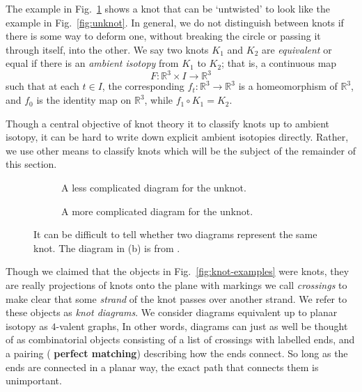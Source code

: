 \documentclass[12pt]{report}
\newcommand{\R}{\mathbb{R}}
\newcommand{\notered}[1]{{\color{Red} \textbf{#1}}}
\begin{document}
The example in Fig.~\ref{fig:unknot-twisted} shows a knot that can be `untwisted' to look like the example in Fig.~\ref{fig:unknot}. In general, we do not distinguish between knots if there is some way to deform one, without breaking the circle or passing it through itself, into the other. We say two knots $K_{1}$ and $K_{2}$ are \textit{equivalent} or equal if there is an \textit{ambient isotopy} from $K_{1}$ to $K_{2}$; that is, a continuous map
\[F: \R^{3} \times I \longrightarrow \R^{3}\]
such that at each $t \in I$, the corresponding $f_{t}: \R^{3} \longrightarrow \R^{3}$ is a homeomorphism of $\R^{3}$, and $f_{0}$ is the identity map on $\R^{3}$, while $f_{1} \circ K_{1} = K_{2}$.

Though a central objective of knot theory it to classify knots up to ambient isotopy, it can be hard to write down explicit ambient isotopies directly. Rather, we use other means to classify knots which will be the subject of the remainder of this section.

\begin{figure}[hbt]
	\centering
	\hspace*{\fill}
	\begin{subfigure}[b]{0.35 \textwidth}
		\centering
		\def\svgscale{0.2}
		
		\caption{A less complicated diagram for the unknot.}
		\label{fig:unknot-twisted}
	\end{subfigure}
	\hspace*{\fill}
	\begin{subfigure}[b]{0.35 \textwidth}
		\centering
		\def\svgscale{0.2}
		
		\caption{A more complicated diagram for the unknot.}
		\label{fig:unknot-goertiz}
	\end{subfigure}
	\hspace*{\fill}
	\caption{It can be difficult to tell whether two diagrams represent the same knot. The diagram in (b) is from \cite{notes-on-knot-theory}.}
	\label{fig:more-unknots}
\end{figure}

Though we claimed that the objects in Fig.~\ref{fig:knot-examples} were knots, they are really projections of knots onto the plane with markings we call \textit{crossings} to make clear that some \textit{strand} of the knot passes over another strand. We refer to these objects as \textit{knot diagrams}. We consider diagrams equivalent up to planar isotopy as $4$-valent graphs, In other words, diagrams can just as well be thought of as combinatorial objects consisting of a list of crossings with labelled ends, and a pairing (\notered{perfect matching}) describing how the ends connect. So long as the ends are connected in a planar way, the exact path that connects them is unimportant.
\end{document}
